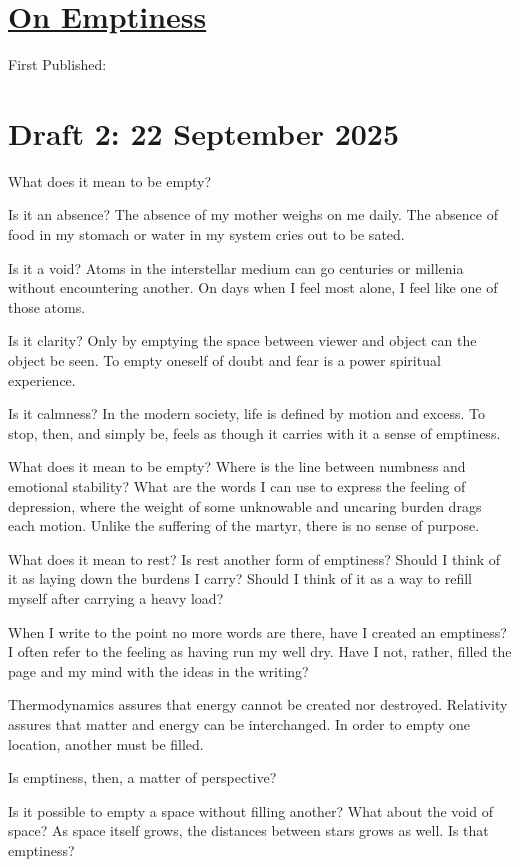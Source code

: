 \documentclass[12pt]{article}
\renewcommand{\,}{\textsuperscript{,}}
\begin{document}
  
\doublespacing  
\section{\href{emptiness.html}{On Emptiness}}  
First Published: 

\section{Draft 2: 22 September 2025}
What does it mean to be empty?

Is it an absence?
The absence of my mother weighs on me daily.
The absence of food in my stomach or water in my system cries out to be sated.

Is it a void?
Atoms in the interstellar medium can go centuries or millenia without encountering another.
On days when I feel most alone, I feel like one of those atoms.

Is it clarity?
Only by emptying the space between viewer and object can the object be seen.
To empty oneself of doubt and fear is a power spiritual experience.

Is it calmness?
In the modern society, life is defined by motion and excess.
To stop, then, and simply be, feels as though it carries with it a sense of emptiness.

What does it mean to be empty?
Where is the line between numbness and emotional stability?
What are the words I can use to express the feeling of depression, where the weight of some unknowable and uncaring burden drags each motion.
Unlike the suffering of the martyr, there is no sense of purpose.

What does it mean to rest?
Is rest another form of emptiness?
Should I think of it as laying down the burdens I carry?
Should I think of it as a way to refill myself after carrying a heavy load?

When I write to the point no more words are there, have I created an emptiness?
I often refer to the feeling as having run my well dry.
Have I not, rather, filled the page and my mind with the ideas in the writing?

Thermodynamics assures that energy cannot be created nor destroyed.
Relativity assures that matter and energy can be interchanged.
In order to empty one location, another must be filled.

Is emptiness, then, a matter of perspective?

Is it possible to empty a space without filling another?
What about the void of space?
As space itself grows, the distances between stars grows as well.
Is that emptiness?
\end{document}
